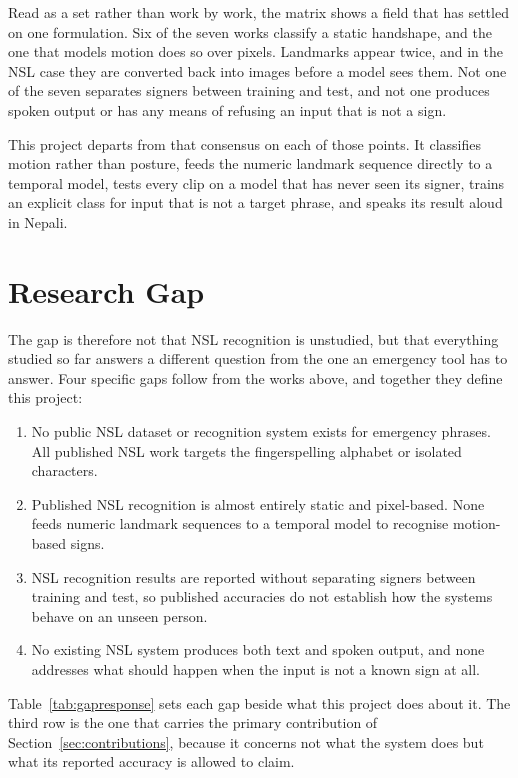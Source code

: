 \noindent Read as a set rather than work by work, the matrix shows a field that has settled on one formulation. Six of the seven works classify a static handshape, and the one that models motion does so over pixels. Landmarks appear twice, and in the NSL case they are converted back into images before a model sees them. Not one of the seven separates signers between training and test, and not one produces spoken output or has any means of refusing an input that is not a sign.

This project departs from that consensus on each of those points. It classifies motion rather than posture, feeds the numeric landmark sequence directly to a temporal model, tests every clip on a model that has never seen its signer, trains an explicit class for input that is not a target phrase, and speaks its result aloud in Nepali.

\section{Research Gap}
\label{sec:researchgap}
The gap is therefore not that NSL recognition is unstudied, but that everything studied so far answers a different question from the one an emergency tool has to answer. Four specific gaps follow from the works above, and together they define this project:

\begin{enumerate}
    \item No public NSL dataset or recognition system exists for emergency phrases. All published NSL work targets the fingerspelling alphabet or isolated characters.
    \item Published NSL recognition is almost entirely static and pixel-based. None feeds numeric landmark sequences to a temporal model to recognise motion-based signs.
    \item NSL recognition results are reported without separating signers between training and test, so published accuracies do not establish how the systems behave on an unseen person.
    \item No existing NSL system produces both text and spoken output, and none addresses what should happen when the input is not a known sign at all.
\end{enumerate}

\noindent Table~\ref{tab:gapresponse} sets each gap beside what this project does about it. The third row is the one that carries the primary contribution of Section~\ref{sec:contributions}, because it concerns not what the system does but what its reported accuracy is allowed to claim.

